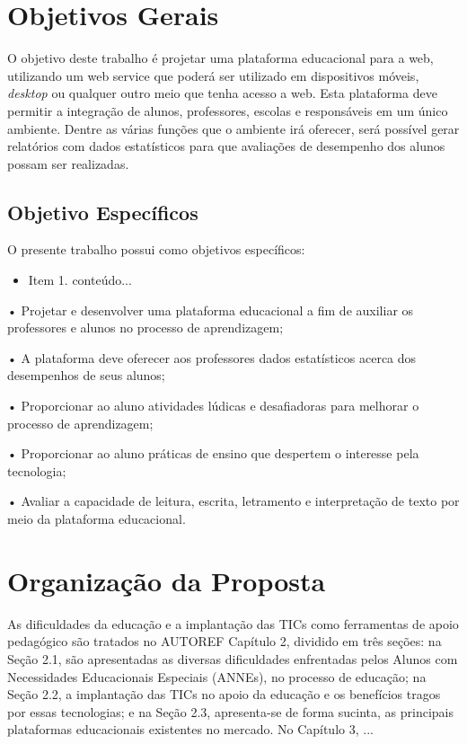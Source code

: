 \section{Objetivos Gerais} \label{Sec:Objetivos}

O objetivo deste trabalho é projetar uma plataforma educacional para a web, utilizando um web service que poderá ser utilizado em dispositivos móveis, \textit{desktop} ou qualquer outro meio que tenha acesso a web. Esta plataforma deve permitir a integração de alunos, professores, escolas e responsáveis em um único ambiente. Dentre as várias funções que o ambiente irá oferecer, será possível gerar relatórios com dados estatísticos para que avaliações de desempenho dos alunos possam ser realizadas.


\subsection{Objetivo Específicos} \label{Sec:ObjetivoGeral}		

O presente trabalho possui como objetivos específicos:

\begin{itemize}
	
	\item Item 1.
	conteúdo...
\end{itemize}

• Projetar e desenvolver uma plataforma educacional a fim de auxiliar os professores e alunos
no processo de aprendizagem;

• A plataforma deve oferecer aos professores dados estatísticos acerca dos desempenhos de seus alunos;

• Proporcionar ao aluno atividades lúdicas e desafiadoras para melhorar o processo de aprendizagem;

• Proporcionar ao aluno práticas de ensino que despertem o interesse pela tecnologia;

• Avaliar a capacidade de leitura, escrita, letramento e interpretação de texto por meio da plataforma educacional.


\section{Organização da Proposta} \label{Sec:Organizacao}

As dificuldades da educação e a implantação das TICs como ferramentas de apoio pedagógico são tratados no AUTOREF Capítulo 2, dividido em três seções: na Seção 2.1, são apresentadas as diversas dificuldades enfrentadas pelos Alunos com Necessidades Educacionais Especiais (ANNEs), no processo de educação; na Seção 2.2, a implantação das TICs no apoio da educação e os benefícios tragos por essas tecnologias; e na Seção 2.3, apresenta-se de forma sucinta, as principais plataformas educacionais existentes no mercado.
No Capítulo 3, ...

